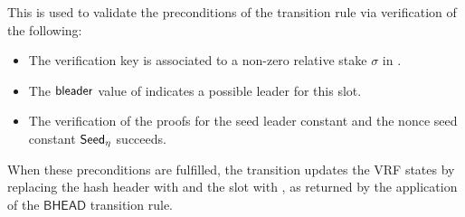 This is used to validate the preconditions of the transition rule via
verification of the following:

\begin{itemize}
\item The verification key is associated to a non-zero relative stake
  $\sigma$ in .
\item The $\mathsf{bleader}$ value of  indicates a possible leader for
  this slot.
\item The verification of the proofs for the seed leader constant \var{\Seedl}
  and the nonce seed constant $\mathsf{Seed}_\eta$ succeeds.
\end{itemize}

When these preconditions are fulfilled, the transition updates the VRF states by
replacing the hash header with  and the slot with , as
returned by the application of the $\mathsf{BHEAD}$ transition rule.

